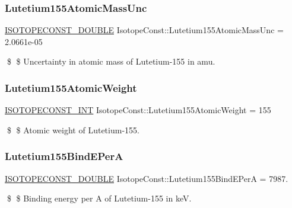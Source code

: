 \subsubsection{\texorpdfstring{Lutetium155\+Atomic\+Mass\+Unc}{Lutetium155AtomicMassUnc}}
{\footnotesize\ttfamily \mbox{\hyperlink{group___isotope_const-_macros_ga8f45a7272ce02c0b4c65c44636ed719a}{I\+S\+O\+T\+O\+P\+E\+C\+O\+N\+S\+T\+\_\+\+D\+O\+U\+B\+LE}} Isotope\+Const\+::\+Lutetium155\+Atomic\+Mass\+Unc = 2.\+0661e-\/05}

\$ \$ Uncertainty in atomic mass of Lutetium-\/155 in amu. \mbox{\label{group___isotope_const-_lutetium-_lu155_ga7443cba01ce3d7a600f92bd262e951b3}} 
\subsubsection{\texorpdfstring{Lutetium155\+Atomic\+Weight}{Lutetium155AtomicWeight}}
{\footnotesize\ttfamily \mbox{\hyperlink{group___isotope_const-_macros_ga5f18360b3e99483a35c32d789e62621c}{I\+S\+O\+T\+O\+P\+E\+C\+O\+N\+S\+T\+\_\+\+I\+NT}} Isotope\+Const\+::\+Lutetium155\+Atomic\+Weight = 155}

\$ \$ Atomic weight of Lutetium-\/155. \mbox{\label{group___isotope_const-_lutetium-_lu155_ga9f9d93ab8ae7c8d0a24c8ea7dd91adc3}} 
\subsubsection{\texorpdfstring{Lutetium155\+Bind\+E\+PerA}{Lutetium155BindEPerA}}
{\footnotesize\ttfamily \mbox{\hyperlink{group___isotope_const-_macros_ga8f45a7272ce02c0b4c65c44636ed719a}{I\+S\+O\+T\+O\+P\+E\+C\+O\+N\+S\+T\+\_\+\+D\+O\+U\+B\+LE}} Isotope\+Const\+::\+Lutetium155\+Bind\+E\+PerA = 7987.}

\$ \$ Binding energy per A of Lutetium-\/155 in keV. \mbox{\label{group___isotope_const-_lutetium-_lu155_ga5ad50bbf6e53948ed4cc48cea1140dca}} 
